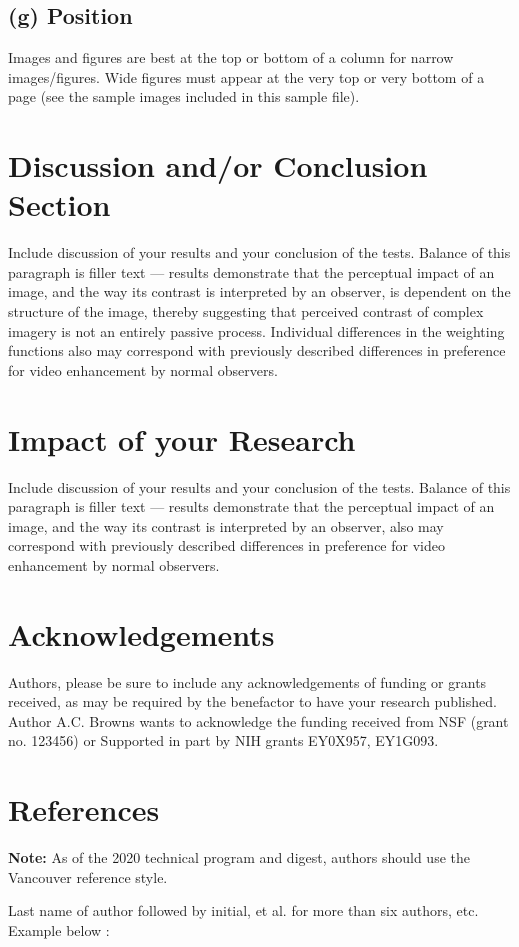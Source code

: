 \documentclass[9pt]{extarticle}
\begin{document}
\begin{multicols}{2}
\subsection{(g) Position}
Images and figures are best at the top or bottom of a column for narrow images/figures.
Wide figures must appear at the very top or very bottom of a page (see the sample images included in this sample file).

\section{Discussion and/or Conclusion Section}

Include discussion of your results and your conclusion of the tests.
Balance of this paragraph is filler text — results demonstrate that the perceptual impact of an image, and the way its contrast is interpreted by an observer, is dependent on the structure of the image, thereby suggesting that perceived contrast of complex imagery is not an entirely passive process.
Individual differences in the weighting functions also may correspond with previously described differences in preference for video enhancement by normal observers.  

\section{Impact of your Research}

Include discussion of your results and your conclusion of the tests.
Balance of this paragraph is filler text — results demonstrate that the perceptual impact of an image, and the way its contrast is interpreted by an observer, also may correspond with previously described differences in preference for video enhancement by normal observers.  

\section{Acknowledgements}

Authors, please be sure to include any acknowledgements of funding or grants received, as may be required by the benefactor to have your research published.
Author A.C. Browns wants to acknowledge the funding received from NSF (grant no. 123456) or Supported in part by NIH grants EY0X957, EY1G093.

\section{References}

\textbf{Note:} As of the 2020 technical program and digest, authors should use the Vancouver reference style. 

Last name of author followed by initial, et al. for more than six authors, etc. Example below \cite{davis_using_2007}:

\begingroup
\renewcommand{\section}[2]{} %
\raggedright

\endgroup

\end{multicols}
\end{document}
